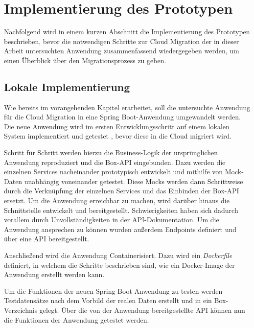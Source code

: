 \chapter{Implementierung des Prototypen}

Nachfolgend wird in einem kurzen Abschnitt die Implementierung des Prototypen beschrieben, bevor die notwendigen Schritte zur Cloud Migration der in dieser Arbeit untersuchten Anwendung zusammenfassend wiedergegeben werden, um einen Überblick über den Migrationsprozess zu geben.

\section{Lokale Implementierung}

Wie bereits im vorangehenden Kapitel erarbeitet, soll die untersuchte Anwendung für die Cloud Migration in eine \gls{Spring Boot}-Anwendung umgewandelt werden. Die neue Anwendung wird im ersten Entwicklungsschritt auf einem lokalen System implementiert und getestet , bevor diese in die Cloud migriert wird.

Schritt für Schritt werden hierzu die Business-Logik der ursprünglichen Anwendung reproduziert und die \gls{Box}-\ac{API} eingebunden. Dazu werden die einzelnen Services nacheinander prototypisch entwickelt und mithilfe von Mock-Daten unabhängig voneinander getestet. Diese Mocks werden dann Schrittweise durch die Verknüpfung der einzelnen Services und das Einbinden der \gls{Box}-\ac{API} ersetzt. Um die Anwendung erreichbar zu machen, wird darüber hinaus die Schnittstelle entwickelt und bereitgestellt. Schwierigkeiten haben sich dadurch vorallem durch Unvollständigkeiten in der \ac{API}-Dokumentation. Um die Anwendung ansprechen zu können wurden außerdem Endpoints definiert und über eine \ac{API} bereitgestellt.

Anschließend wird die Anwendung Containerisiert. Dazu wird ein \textit{Dockerfile} definiert, in welchem die Schritte beschrieben sind, wie ein Docker-Image der Anwendung erstellt werden kann.

Um die Funktionen der neuen \gls{Spring Boot} Anwendung zu testen werden Testdatensätze nach dem Vorbild der realen Daten erstellt und in ein \gls{Box}-Verzeichnis gelegt. Über die von der Anwendung bereitgestellte \ac{API} können nun die Funktionen der Anwendung getestet werden. \pagebreak

